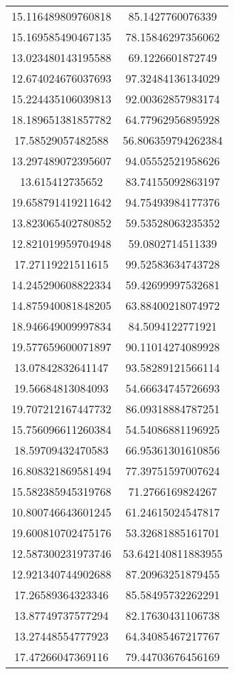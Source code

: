 \begin{table}
\begin{tabular}{cc}
15.116489809760818 & 85.1427760076339 \\
15.169585490467135 & 78.15846297356062 \\
13.023480143195588 & 69.1226601872749 \\
12.674024676037693 & 97.32484136134029 \\
15.224435106039813 & 92.00362857983174 \\
18.189651381857782 & 64.77962956895928 \\
17.58529057482588 & 56.806359794262384 \\
13.297489072395607 & 94.05552521958626 \\
13.615412735652 & 83.74155092863197 \\
19.658791419211642 & 94.75493984177376 \\
13.823065402780852 & 59.53528063235352 \\
12.821019959704948 & 59.0802714511339 \\
17.27119221511615 & 99.52583634743728 \\
14.245290608822334 & 59.42699997532681 \\
14.875940081848205 & 63.88400218074972 \\
18.946649009997834 & 84.5094122771921 \\
19.577659600071897 & 90.11014274089928 \\
13.07842832641147 & 93.58289121566114 \\
19.56684813084093 & 54.66634745726693 \\
19.707212167447732 & 86.09318884787251 \\
15.756096611260384 & 54.54086881196925 \\
18.59709432470583 & 66.95361301610856 \\
16.808321869581494 & 77.39751597007624 \\
15.582385945319768 & 71.2766169824267 \\
10.800746643601245 & 61.24615024547817 \\
19.600810702475176 & 53.32681885161701 \\
12.587300231973746 & 53.642140811883955 \\
12.921340744902688 & 87.20963251879455 \\
17.26589364323346 & 85.58495732262291 \\
13.87749737577294 & 82.17630431106738 \\
13.27448554777923 & 64.34085467217767 \\
17.47266047369116 & 79.44703676456169 \\

\end{tabular}
\end{table}
